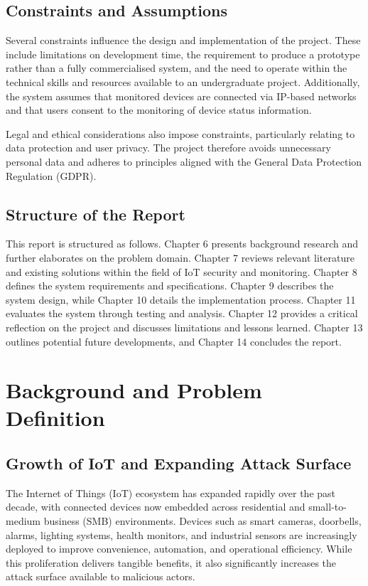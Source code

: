 \section{Constraints and Assumptions}

Several constraints influence the design and implementation of the project. These include limitations on development time, the requirement to produce a prototype rather than a fully commercialised system, and the need to operate within the technical skills and resources available to an undergraduate project. Additionally, the system assumes that monitored devices are connected via IP-based networks and that users consent to the monitoring of device status information.

Legal and ethical considerations also impose constraints, particularly relating to data protection and user privacy. The project therefore avoids unnecessary personal data and adheres to principles aligned with the General Data Protection Regulation (GDPR).

\section{Structure of the Report}

This report is structured as follows. Chapter 6 presents background research and further elaborates on the problem domain. Chapter 7 reviews relevant literature and existing solutions within the field of IoT security and monitoring. Chapter 8 defines the system requirements and specifications. Chapter 9 describes the system design, while Chapter 10 details the implementation process. Chapter 11 evaluates the system through testing and analysis. Chapter 12 provides a critical reflection on the project and discusses limitations and lessons learned. Chapter 13 outlines potential future developments, and Chapter 14 concludes the report.

\chapter{Background and Problem Definition}

\section{Growth of IoT and Expanding Attack Surface}

The Internet of Things (IoT) ecosystem has expanded rapidly over the past decade, with connected devices now embedded across residential and small-to-medium business (SMB) environments. Devices such as smart cameras, doorbells, alarms, lighting systems, health monitors, and industrial sensors are increasingly deployed to improve convenience, automation, and operational efficiency. While this proliferation delivers tangible benefits, it also significantly increases the attack surface available to malicious actors.

